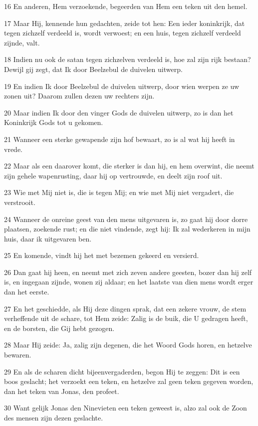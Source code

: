 \par 16 En anderen, Hem verzoekende, begeerden van Hem een teken uit den hemel.
\par 17 Maar Hij, kennende hun gedachten, zeide tot hen: Een ieder koninkrijk, dat tegen zichzelf verdeeld is, wordt verwoest; en een huis, tegen zichzelf verdeeld zijnde, valt.
\par 18 Indien nu ook de satan tegen zichzelven verdeeld is, hoe zal zijn rijk bestaan? Dewijl gij zegt, dat Ik door Beelzebul de duivelen uitwerp.
\par 19 En indien Ik door Beelzebul de duivelen uitwerp, door wien werpen ze uw zonen uit? Daarom zullen dezen uw rechters zijn.
\par 20 Maar indien Ik door den vinger Gods de duivelen uitwerp, zo is dan het Koninkrijk Gods tot u gekomen.
\par 21 Wanneer een sterke gewapende zijn hof bewaart, zo is al wat hij heeft in vrede.
\par 22 Maar als een daarover komt, die sterker is dan hij, en hem overwint, die neemt zijn gehele wapenrusting, daar hij op vertrouwde, en deelt zijn roof uit.
\par 23 Wie met Mij niet is, die is tegen Mij; en wie met Mij niet vergadert, die verstrooit.
\par 24 Wanneer de onreine geest van den mens uitgevaren is, zo gaat hij door dorre plaatsen, zoekende rust; en die niet vindende, zegt hij: Ik zal wederkeren in mijn huis, daar ik uitgevaren ben.
\par 25 En komende, vindt hij het met bezemen gekeerd en versierd.
\par 26 Dan gaat hij heen, en neemt met zich zeven andere geesten, bozer dan hij zelf is, en ingegaan zijnde, wonen zij aldaar; en het laatste van dien mens wordt erger dan het eerste.
\par 27 En het geschiedde, als Hij deze dingen sprak, dat een zekere vrouw, de stem verheffende uit de schare, tot Hem zeide: Zalig is de buik, die U gedragen heeft, en de borsten, die Gij hebt gezogen.
\par 28 Maar Hij zeide: Ja, zalig zijn degenen, die het Woord Gods horen, en hetzelve bewaren.
\par 29 En als de scharen dicht bijeenvergaderden, begon Hij te zeggen: Dit is een boos geslacht; het verzoekt een teken, en hetzelve zal geen teken gegeven worden, dan het teken van Jonas, den profeet.
\par 30 Want gelijk Jonas den Ninevieten een teken geweest is, alzo zal ook de Zoon des mensen zijn dezen geslachte.
